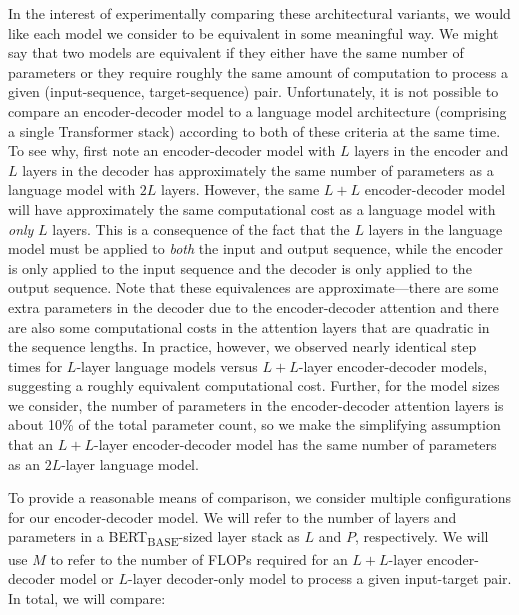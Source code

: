 In the interest of experimentally comparing these architectural variants, we would like each model we consider to be equivalent in some meaningful way. We might say that two models are equivalent if they either have the same number of parameters or they require roughly the same amount of computation to process a given (input-sequence, target-sequence) pair. Unfortunately, it is not possible to compare an encoder-decoder model to a language model architecture (comprising a single Transformer stack) according to both of these criteria at the same time. To see why, first note an encoder-decoder model with $L$ layers in the encoder and $L$ layers in the decoder has approximately the same number of parameters as a language model with $2L$ layers. However, the same $L + L$ encoder-decoder model will have approximately the same computational cost as a language model with \textit{only} $L$ layers. This is a consequence of the fact that the $L$ layers in the language model must be applied to \textit{both} the input and output sequence, while the encoder is only applied to the input sequence and the decoder is only applied to the output sequence. Note that these equivalences are approximate---there are some extra parameters in the decoder due to the encoder-decoder attention and there are also some computational costs in the attention layers that are quadratic in the sequence lengths. In practice, however, we observed nearly identical step times for $L$-layer language models versus $L + L$-layer encoder-decoder models, suggesting a roughly equivalent computational cost. Further, for the model sizes we consider, the number of parameters in the encoder-decoder attention layers is about 10\% of the total parameter count, so we make the simplifying assumption that an $L + L$-layer encoder-decoder model has the same number of parameters as an $2L$-layer language model.

To provide a reasonable means of comparison, we consider multiple configurations for our encoder-decoder model. We will refer to the number of layers and parameters in a BERT\textsubscript{BASE}-sized layer stack as $L$ and $P$, respectively. We will use $M$ to refer to the number of FLOPs required for an $L + L$-layer encoder-decoder model or $L$-layer decoder-only model to process a given input-target pair. In total, we will compare:

